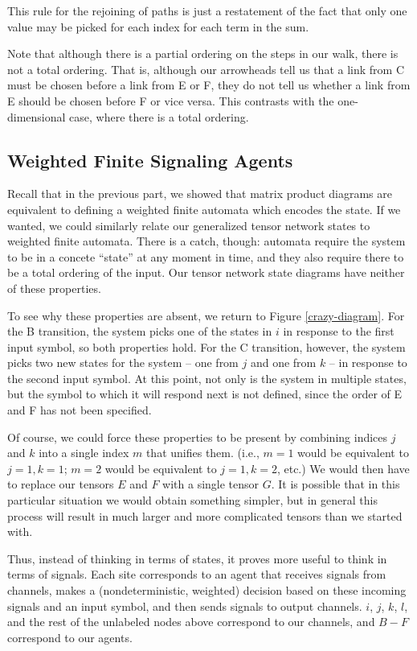 \documentclass[12pt]{amsbook}
\theoremstyle{plain}
\theoremstyle{definition}
\theoremstyle{remark}
\begin{document}
This rule for the rejoining of paths is just a restatement of the fact that only one value may be picked for each index for each term in the sum.

Note that although there is a partial ordering on the steps in our walk, there is not a total ordering.  That is, although our arrowheads tell us that a link from C must be chosen before a link from E or F, they do not tell us whether a link from E should be chosen before F or vice versa.  This contrasts with the one-dimensional case, where there is a total ordering.
\subsection{Weighted Finite Signaling Agents}

Recall that in the previous part, we showed that matrix product diagrams are equivalent to defining a weighted finite automata which encodes the state.  If we wanted, we could similarly relate our generalized tensor network states to weighted finite automata.  There is a catch, though:  automata require the system to be in a concete ``state'' at any moment in time, and they also require there to be a total ordering of the input.  Our tensor network state diagrams have neither of these properties.

To see why these properties are absent, we return to Figure \ref{crazy-diagram}.  For the B transition, the system picks one of the states in $i$ in response to the first input symbol, so both properties hold.  For the C transition, however, the system picks two new states for the system -- one from $j$ and one from $k$ -- in response to the second input symbol.  At this point, not only is the system in multiple states, but the symbol to which it will respond next is not defined, since the order of E and F has not been specified.

Of course, we could force these properties to be present by combining indices $j$ and $k$ into a single index $m$ that unifies them.  (i.e., $m=1$ would be equivalent to $j=1, k=1$;  $m=2$ would be equivalent to $j=1,k=2$, etc.)  We would then have to replace our tensors $E$ and $F$ with a single tensor $G$.  It is possible that in this particular situation we would obtain something simpler, but in general this process will result in much larger and more complicated tensors than we started with.

Thus, instead of thinking in terms of states, it proves more useful to think in terms of signals.  Each site corresponds to an agent that receives signals from channels, makes a (nondeterministic, weighted) decision based on these incoming signals and an input symbol, and then sends signals to output channels.  $i$, $j$, $k$, $l$, and the rest of the unlabeled nodes above correspond to our channels, and $B-F$ correspond to our agents.
\end{document}
